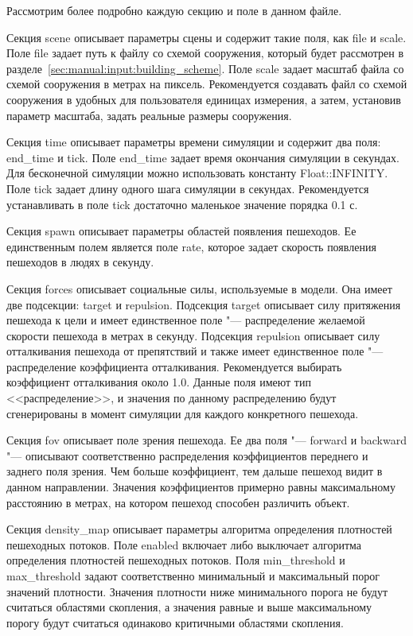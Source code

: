 Рассмотрим более подробно каждую секцию и поле в данном файле.

Секция scene описывает параметры сцены и содержит такие поля, как file и scale.
Поле file задает путь к файлу со схемой сооружения, который будет рассмотрен в разделе~\ref{sec:manual:input:building_scheme}.
Поле scale задает масштаб файла со схемой сооружения в метрах на пиксель.
Рекомендуется создавать файл со схемой сооружения в удобных для пользователя единицах измерения, а затем, установив параметр масштаба, задать реальные размеры сооружения.

Секция time описывает параметры времени симуляции и содержит два поля: end\_time и tick.
Поле end\_time задает время окончания симуляции в секундах. Для бесконечной симуляции можно использовать константу Float::INFINITY.
Поле tick задает длину одного шага симуляции в секундах. Рекомендуется устанавливать в поле tick достаточно маленькое значение порядка 0.1 с.

Секция spawn описывает параметры областей появления пешеходов. Ее единственным полем является поле rate, которое задает скорость появления пешеходов в людях в секунду.

Секция forces описывает социальные силы, используемые в модели.
Она имеет две подсекции: target и repulsion.
Подсекция target описывает силу притяжения пешехода к цели и имеет единственное поле "--- распределение желаемой скорости пешехода в метрах в секунду.
Подсекция repulsion описывает силу отталкивания пешехода от препятствий и также имеет единственное поле "--- распределение коэффициента отталкивания.
Рекомендуется выбирать коэффициент отталкивания около 1.0.
Данные поля имеют тип <<распределение>>, и значения по данному распределению будут сгенерированы в момент симуляции для каждого конкретного пешехода.

Секция fov описывает поле зрения пешехода.
Ее два поля "--- forward и backward "--- описывают соответственно распределения коэффициентов переднего и заднего поля зрения.
Чем больше коэффициент, тем дальше пешеход видит в данном направлении.
Значения коэффициентов примерно равны максимальному расстоянию в метрах, на котором пешеход способен различить объект.

Секция density\_map описывает параметры алгоритма определения плотностей пешеходных потоков.
Поле enabled включает либо выключает алгоритма определения плотностей пешеходных потоков.
Поля min\_threshold и max\_threshold задают соответственно минимальный и максимальный порог значений плотности.
Значения плотности ниже минимального порога не будут считаться областями скопления,
а значения равные и выше максимальному порогу будут считаться одинаково критичными областями скопления.

